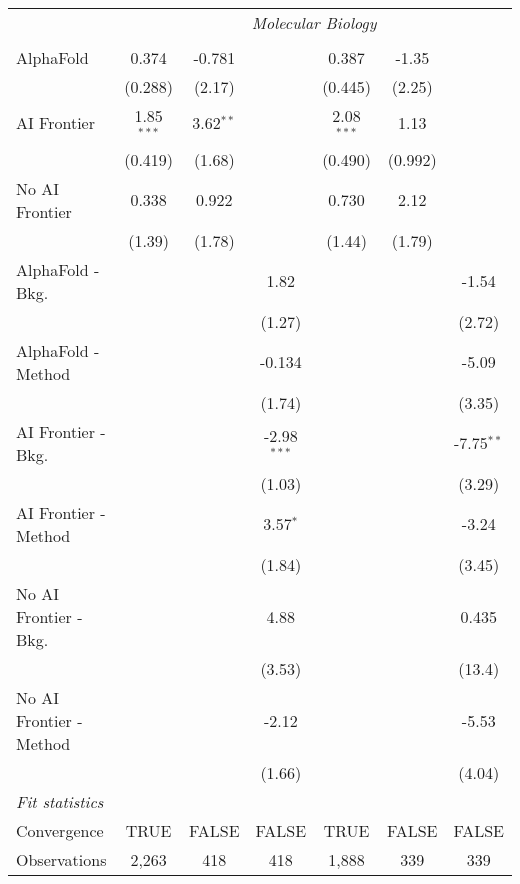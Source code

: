 \begin{tabular}{lcccccc}
 & \multicolumn{6}{c}{\textit{Molecular Biology}} \\ \\
   AlphaFold               & 0.374        & -0.781      &               & 0.387        & -1.35   &   \\   
                           & (0.288)      & (2.17)      &               & (0.445)      & (2.25)  &   \\   
   AI Frontier             & 1.85$^{***}$ & 3.62$^{**}$ &               & 2.08$^{***}$ & 1.13    &   \\   
                           & (0.419)      & (1.68)      &               & (0.490)      & (0.992) &   \\   
   No AI Frontier          & 0.338        & 0.922       &               & 0.730        & 2.12    &   \\   
                           & (1.39)       & (1.78)      &               & (1.44)       & (1.79)  &   \\   
   AlphaFold - Bkg.        &              &             & 1.82          &              &         & -1.54\\   
                           &              &             & (1.27)        &              &         & (2.72)\\   
   AlphaFold - Method      &              &             & -0.134        &              &         & -5.09\\   
                           &              &             & (1.74)        &              &         & (3.35)\\   
   AI Frontier - Bkg.      &              &             & -2.98$^{***}$ &              &         & -7.75$^{**}$\\   
                           &              &             & (1.03)        &              &         & (3.29)\\   
   AI Frontier - Method    &              &             & 3.57$^{*}$    &              &         & -3.24\\   
                           &              &             & (1.84)        &              &         & (3.45)\\   
   No AI Frontier - Bkg.   &              &             & 4.88          &              &         & 0.435\\   
                           &              &             & (3.53)        &              &         & (13.4)\\   
   No AI Frontier - Method &              &             & -2.12         &              &         & -5.53\\   
                           &              &             & (1.66)        &              &         & (4.04)\\   
   \midrule
   \emph{Fit statistics}\\
   Convergence             &TRUE          & FALSE       & FALSE         & TRUE         & FALSE   & FALSE\\  
   Observations            & 2,263        & 418         & 418           & 1,888        & 339     & 339\\  
   

\end{tabular}
